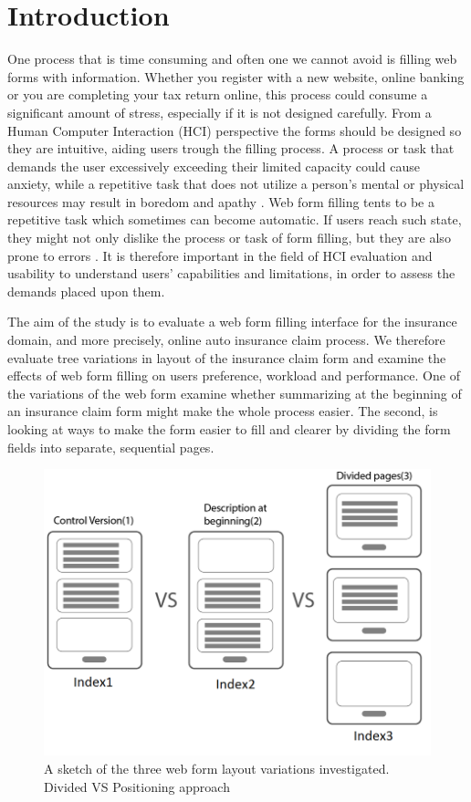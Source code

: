 \documentclass[../main/Feedback.tex]{subfiles}
\begin{document}
\section{Introduction}

One process that is time consuming and often one we cannot avoid is filling web forms with information.
Whether you register with a new website, online banking or you are completing your tax return online, this process could consume a significant amount of stress, especially if it is not designed carefully.
From a Human Computer Interaction (HCI) perspective the forms should be designed so they are intuitive, aiding users trough the filling process.
A process or task that demands the user excessively exceeding their limited capacity could cause anxiety, while a repetitive task that does not utilize a person's mental or physical resources may result in boredom and apathy \cite{afergan2014dynamic}.
Web form filling tents to be a repetitive task which sometimes can become automatic.
If users reach such state, they might not only dislike the process or task of form filling, but they are also prone to errors \cite{pekrun2010boredom}.
It is therefore important in the field of HCI evaluation and usability to understand users' capabilities and limitations, in order to assess the demands placed upon them.


The aim of the study is to evaluate a web form filling interface for the insurance domain, and more precisely, online auto insurance claim process.
We therefore evaluate tree variations in layout of the insurance claim form and examine the effects of web form filling on users preference, workload and performance.
One of the variations of the web form examine whether summarizing at the beginning of an insurance claim form might make the whole process easier.
The second, is looking at ways to make the form easier to fill and clearer by dividing the form fields into separate, sequential pages.

\begin{figure} [h]
	\centering
	\includegraphics[width=\linewidth]{../figures/layout-variations}
	\caption{A sketch of the three web form layout variations investigated. Divided VS Positioning approach}
	\label{fig:layout-variations}
\end{figure}
\end{document}
